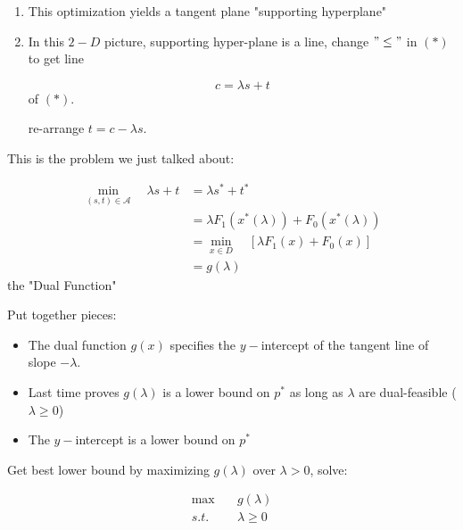 \begin{enumerate}
	\item This optimization yields a tangent plane "supporting hyperplane"
	
	\item In this $2-D$ picture, supporting hyper-plane is a line, change $"\leq"$ in $(*)$ to get line 
	
	\begin{equation*}
	c =\lambda s + t
	\end{equation*} of $(*)$.
	
	re-arrange $t = c - \lambda s$.
\end{enumerate}


This is the problem we just talked about:

\begin{align*}
\min_{(s,t)\in \mathcal{A}} \quad \lambda s + t &= \lambda s^* + t^*\\
&= \lambda F_1(x^*(\lambda)) + F_0(x^*(\lambda))\\
&= \min_{x\in D} \quad[\lambda F_1(x) + F_0(x)]\\
&= g(\lambda) 
\end{align*} the "Dual Function"

Put together pieces:






\begin{itemize}
	\item The dual function $g(x)$ specifies the $y-$intercept of the tangent line of slope $-\lambda$.
	
	\item Last time proves $g(\lambda)$ is a lower bound on $p^*$ as long as $\lambda$ are dual-feasible ($\lambda \geq 0$)
	
	\item The $y-$intercept is a lower bound on $p^*$
\end{itemize}

Get best lower bound by maximizing $g(\lambda)$ over $\lambda > 0$, solve:

\begin{align*}
\max \quad &g(\lambda)\\
s.t. &\lambda \geq 0
\end{align*}








